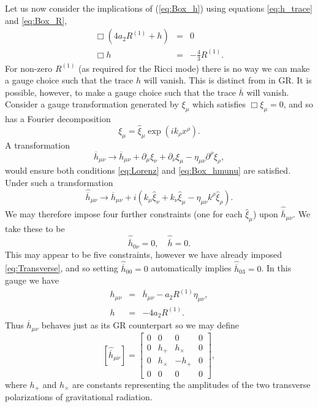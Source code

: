 \documentclass[aps,prd,reprint,showpacs]{revtex4-1}
\newcommand{\eqnref}[1]{(\ref{eq:#1})}
\begin{document}
Let us now consider the implications of \eqnref{Box_h} using equations \eqref{eq:h_trace} and \eqref{eq:Box_R},
\begin{eqnarray}
\Box\left(4a_2R^{(1)} + h\right) & = & 0 \nonumber \\
\Box h & = & -\frac{4}{3}R^{(1)}.
\end{eqnarray}
For non-zero $R^{(1)}$ (as required for the Ricci mode) there is no way we can make a gauge choice such that the trace $h$ will vanish\cite{Corda2007, Capozziello2008}. This is distinct from in GR. It is possible, however, to make a gauge choice such that the trace $\overline{h}$ will vanish. Consider a gauge transformation generated by $\xi_\mu$ which satisfies $\Box \xi_\mu = 0$, and so has a Fourier decomposition
\begin{equation}
\xi_\mu = \widehat{\xi}_\mu \exp\left(ik_\rho x^\rho\right).
\end{equation}
A transformation
\begin{equation}
\overline{h}_{\mu\nu} \rightarrow \overline{h}_{\mu\nu} + \partial_\mu\xi_\nu + \partial_\nu\xi_\mu - \eta_{\mu\nu}\partial^\rho\xi_\rho,
\end{equation}
would ensure both conditions \eqref{eq:Lorenz} and \eqref{eq:Box_hmunu} are satisfied\cite{Misner1973}. Under such a transformation
\begin{equation}
\widehat{\overline{h}}_{\mu\nu} \rightarrow \widehat{\overline{h}}_{\mu\nu} + i\left(k_\mu\widehat{\xi}_\nu + k_\nu\widehat{\xi}_\mu - \eta_{\mu\nu}k^\rho\widehat{\xi}_\rho\right).
\end{equation}
We may therefore impose four further constraints (one for each $\widehat{\xi}_\mu$) upon $\widehat{\overline{h}}_{\mu\nu}$. We take these to be
\begin{equation}
\widehat{\overline{h}}_{0\nu} = 0, \quad \widehat{\overline{h}} = 0.
\end{equation}
This may appear to be five constraints, however we have already imposed \eqref{eq:Transverse}, and so setting $\widehat{\overline{h}}_{00} = 0$ automatically implies $\widehat{\overline{h}}_{03} = 0$. In this gauge we have
\begin{eqnarray}
h_{\mu\nu} & = & \overline{h}_{\mu\nu} - a_2 R^{(1)}\eta_{\mu\nu},\\
h & = & -4a_2R^{(1)}.
\label{eq:gauge}
\end{eqnarray}
Thus $\overline{h}_{\mu\nu}$ behaves just as its GR counterpart so we may define
\begin{equation}
\left[\widehat{\overline{h}}_{\mu\nu}\right] =
\begin{bmatrix}
0 & 0 & 0 & 0\\
0 & h_+ & h_\times & 0\\
0 & h_\times & -h_+ & 0\\
0 & 0 & 0 & 0
\end{bmatrix},
\end{equation}
where $h_+$ and $h_\times$ are constants representing the amplitudes of the two transverse polarizations of gravitational radiation.
\end{document}
